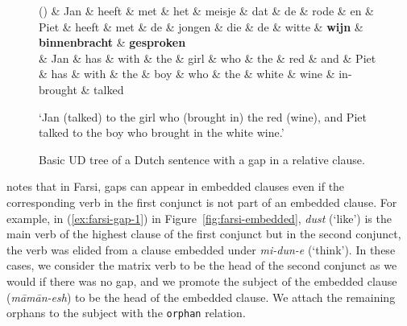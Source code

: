 \documentclass[11pt]{article}
\newcounter{excounter}
\begin{document}
\begin{figure*}
\label{ex:nl-gap-1}
\footnotesize
\begin{dependency}
 \begin{deptext}[column sep=-0.05cm]
   (\theexcounter) \& Jan \& heeft \& met \& het \& meisje \& dat \& de \& rode \& en \& Piet \& heeft \& met \& de \& jongen \& die \& de \& witte \& \textbf{wijn} \& \textbf{binnenbracht} \& \textbf{gesproken} \\
    \& Jan \& has \& with \& the \& girl \& who \& the \& red \& and \& Piet \& has \& with \& the \& boy \& who \& the \& white \& wine \& in-brought \& talked \\
 \end{deptext}
  
\end{dependency}

`Jan (talked) to the girl who (brought in) the red (wine), and Piet talked to the boy who brought in the white wine.' \\ \null \hfill \cite{Wyngaerd2007}

\caption{Basic UD tree of a Dutch sentence with a gap in a relative clause.}
\label{fig:dutch-relcl}

\end{figure*}


 notes that in Farsi, gaps can appear in embedded clauses even if 
the corresponding verb in the first conjunct is not part of an embedded clause. For example, 
in (\ref{ex:farsi-gap-1}) in Figure~\ref{fig:farsi-embedded}, \textit{dust} (`like') is the main verb 
of the highest clause of the first conjunct but in the second conjunct, the verb was elided from 
a clause embedded under \textit{mi-dun-e} (`think'). In these cases, we consider the matrix verb 
to be the head of the second conjunct as we would if there was no gap, and we promote the 
subject of the embedded clause (\textit{m\=am\=an-esh}) to be the head of the embedded clause. 
We attach the remaining orphans to the subject with the \texttt{orphan} relation.
\end{document}
